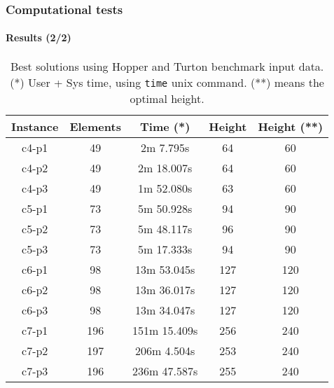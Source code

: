 \begin{frame}
    \frametitle{Computational tests}
    \framesubtitle{Results (2/2)}

    \begin{table}[H]
        \centering
        \small
        \begin{tabular}{|c|c|c|c|c|}
            \hline
            \textbf{Instance} & \textbf{Elements} & \textbf{Time (*)} & \textbf{Height} & \textbf{Height (**)} \\ \hline
            c4-p1             & 49                & 2m 7.795s     & 64              & 60                  \\ \hline
            c4-p2             & 49                & 2m 18.007s    & 64              & 60                  \\ \hline
            c4-p3             & 49                & 1m 52.080s    & 63              & 60                  \\ \hline
            c5-p1             & 73                & 5m 50.928s    & 94              & 90                  \\ \hline
            c5-p2             & 73                & 5m 48.117s    & 96              & 90                  \\ \hline
            c5-p3             & 73                & 5m 17.333s    & 94              & 90                  \\ \hline
            c6-p1             & 98                & 13m 53.045s   & 127             & 120                 \\ \hline
            c6-p2             & 98                & 13m 36.017s   & 127             & 120                 \\ \hline
            c6-p3             & 98                & 13m 34.047s   & 127             & 120                 \\ \hline
            c7-p1             & 196               & 151m 15.409s  & 256             & 240                 \\ \hline
            c7-p2             & 197               & 206m 4.504s   & 253             & 240                 \\ \hline
            c7-p3             & 196               & 236m 47.587s  & 255             & 240                 \\ \hline
        \end{tabular}
        \label{tab:results}
        \caption{Best solutions using Hopper and Turton benchmark input 
    data. (*) User + Sys time, using \texttt{time} unix command. (**) means the optimal height.}
    \end{table}
\end{frame}


